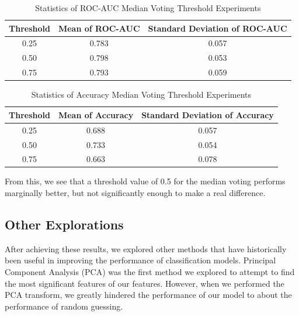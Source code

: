 \documentclass[10pt,twocolumn,letterpaper]{article}
\begin{document}
\begin{table}[h]
  \begin{center}
    \begin{adjustbox}{width=0.47\textwidth}
    \begin{tabular}{|c|c|c|}
      \textbf{Threshold} & \textbf{Mean of ROC-AUC} & \textbf{Standard Deviation of ROC-AUC} \\
      \hline 
      0.25 & 0.783 & 0.057  \\
      0.50 & 0.798 & 0.053  \\
      0.75 & 0.793 & 0.059  \\
    \end{tabular}
    \end{adjustbox}
    \caption{Statistics of ROC-AUC Median Voting Threshold Experiments}
    \label{tab:table4}
  \end{center}
\end{table}
\begin{table}[h]
  \begin{center}
    \begin{adjustbox}{width=0.47\textwidth}
    \begin{tabular}{|c|c|c|}
      \textbf{Threshold} & \textbf{Mean of Accuracy} & \textbf{Standard Deviation of Accuracy} \\
      \hline 
      0.25 & 0.688 & 0.057  \\
      0.50 & 0.733 & 0.054  \\
      0.75 & 0.663 & 0.078  \\
    \end{tabular}
    \end{adjustbox}
    \caption{Statistics of Accuracy Median Voting Threshold Experiments}
    \label{tab:table5}
  \end{center}
\end{table}

From this, we see that a threshold value of 0.5 for the median voting performs marginally better, but not significantly
enough to make a real difference.

\subsection{Other Explorations}
After achieving these results, we explored other methods that have historically been useful in improving the performance of
classification models. Principal Component Analysis (PCA) was the first method we explored to attempt to find the most significant
features of our features. However, when we performed the PCA transform, we greatly hindered the performance of our model to about the
performance of random guessing.
\end{document}
